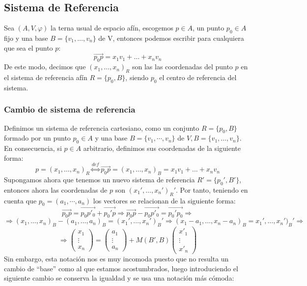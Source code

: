 \documentclass[10pt,a4paper,openright]{book}
\theoremstyle{break}
\begin{document}
\subsection{Sistema de Referencia}
Sea $(A, V, \varphi)$ la terna usual de espacio afín, escogemos $p \in A$, un punto $p_0 \in A $ fijo y una base $B=\{v_1, \ldots, v_n\}$ de V, entonces podemos escribir para cualquiera que sea el punto $p$:
$$\vec{p_0p} = x_1 v_1 + \ldots + x_n v_n$$
De este modo, decimos que $(x_1, \ldots, x_n)_R$ son las las coordenadas del punto $p$ en el sistema de referencia afín $R = \{p_0 , B\}$, siendo $p_0$ el centro de referencia del sistema.

\subsubsection*{Cambio de sistema de referencia}
Definimos un sistema de referencia cartesiano, como un conjunto $R = \{p_0, B\}$ formado por un punto $p_0 \in A$ y una base $B=\{v_1, \cdots, v_n\}$ de $V, B=\{v_1, \ldots, v_n\}$.
En consecuencia, si $p\in A$ arbitrario, definimos sus coordenadas de la siguiente forma:
$$p=(x_1, \ldots, x_n)_R \overset{def}{\Leftrightarrow} \vec{p_0 p} = (x_1, \ldots, x_n)_B = x_1v_1 + \ldots + x_n v_n$$
Supongamos ahora que tenemos un nuevo sistema de referencia $R' = \{p_0', B'\}$, entonces ahora las coordenadas de $p$ son $(x_1', \ldots, x_n')_R'$. Por tanto, teniendo en cuenta que $p_0=(a_1, \cdots , a_n)$ los vectores se relacionan de la siguiente forma:
$$\vec{p_0 p} = \vec{p_0 p'_0} + \vec{p_0' p} \Rightarrow  \vec{p_0 p} -\vec{p_0 p'_0}  =  \vec{p_0'p_0} \Rightarrow$$
$$\Rightarrow (x_1, \ldots, x_n)_B  -(a_1, \ldots, a_n)_B = (x_1', \ldots, x_n')_B' \Rightarrow (x_1 - a_1,  \ldots, x_n - a_n)_B = x_1', \ldots, x_n')_B' \Rightarrow $$
$$\Rightarrow \begin{pmatrix}
x_1 \\ \vdots \\ x_n
\end{pmatrix} =\begin{pmatrix}
a_1 \\ \vdots \\ a_n
\end{pmatrix} + M(B',B)\begin{pmatrix}
x'_1 \\ \vdots \\ x'_n
\end{pmatrix} $$
Sin embargo, esta notación nos es muy incomoda puesto que no resulta un cambio de ``base'' como al que estamos acostumbrados, luego introduciendo el siguiente cambio se conserva la igualdad y se usa una notación más cómoda:
\end{document}

